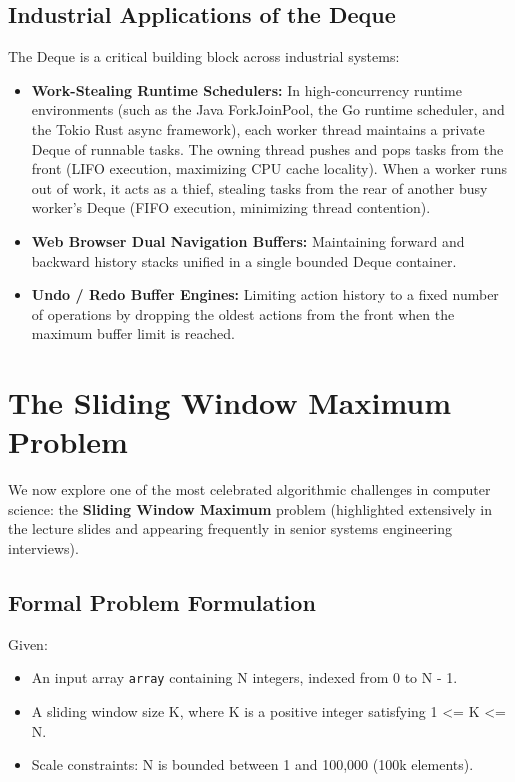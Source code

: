 \documentclass[10pt,journal,compsoc,onecolumn]{IEEEtran}
\begin{document}
\subsection{Industrial Applications of the Deque}
The Deque is a critical building block across industrial systems:
\begin{itemize}
    \item \textbf{Work-Stealing Runtime Schedulers:} In high-concurrency runtime environments (such as the Java ForkJoinPool, the Go runtime scheduler, and the Tokio Rust async framework), each worker thread maintains a private Deque of runnable tasks. The owning thread pushes and pops tasks from the front (LIFO execution, maximizing CPU cache locality). When a worker runs out of work, it acts as a thief, stealing tasks from the rear of another busy worker's Deque (FIFO execution, minimizing thread contention).
    \item \textbf{Web Browser Dual Navigation Buffers:} Maintaining forward and backward history stacks unified in a single bounded Deque container.
    \item \textbf{Undo / Redo Buffer Engines:} Limiting action history to a fixed number of operations by dropping the oldest actions from the front when the maximum buffer limit is reached.
\end{itemize}

\section{The Sliding Window Maximum Problem}
\label{sec:sliding_window}

We now explore one of the most celebrated algorithmic challenges in computer science: the \textbf{Sliding Window Maximum} problem (highlighted extensively in the lecture slides and appearing frequently in senior systems engineering interviews).

\subsection{Formal Problem Formulation}

Given:
\begin{itemize}
    \item An input array \texttt{array} containing N integers, indexed from 0 to N - 1.
    \item A sliding window size K, where K is a positive integer satisfying 1 <= K <= N.
    \item Scale constraints: N is bounded between 1 and 100,000 (100k elements).
\end{itemize}
\end{document}
